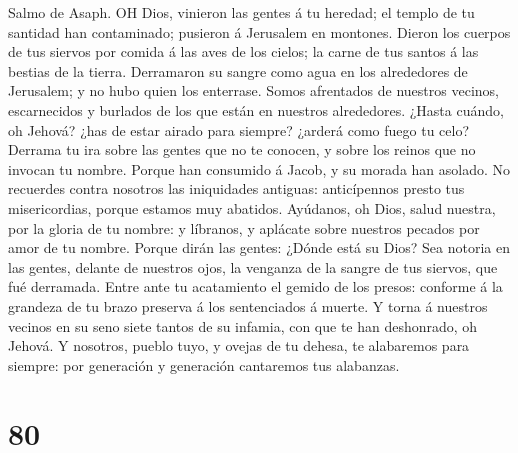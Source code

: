  Salmo de Asaph. OH Dios, vinieron las gentes á tu heredad;
el templo de tu santidad han contaminado; pusieron á Jerusalem en
montones.  Dieron los cuerpos de tus siervos por comida á
las aves de los cielos; la carne de tus santos á las bestias de la
tierra.  Derramaron su sangre como agua en los alrededores
de Jerusalem; y no hubo quien los enterrase.  Somos
afrentados de nuestros vecinos, escarnecidos y burlados de los que están
en nuestros alrededores.  ¿Hasta cuándo, oh Jehová? ¿has de
estar airado para siempre? ¿arderá como fuego tu celo? 
Derrama tu ira sobre las gentes que no te conocen, y sobre los reinos
que no invocan tu nombre.  Porque han consumido á Jacob, y
su morada han asolado.  No recuerdes contra nosotros las
iniquidades antiguas: anticípennos presto tus misericordias, porque
estamos muy abatidos.  Ayúdanos, oh Dios, salud nuestra, por
la gloria de tu nombre: y líbranos, y aplácate sobre nuestros pecados
por amor de tu nombre.  Porque dirán las gentes: ¿Dónde
está su Dios? Sea notoria en las gentes, delante de nuestros ojos, la
venganza de la sangre de tus siervos, que fué derramada. 
Entre ante tu acatamiento el gemido de los presos: conforme á la
grandeza de tu brazo preserva á los sentenciados á muerte. 
Y torna á nuestros vecinos en su seno siete tantos de su infamia, con
que te han deshonrado, oh Jehová.  Y nosotros, pueblo tuyo,
y ovejas de tu dehesa, te alabaremos para siempre: por generación y
generación cantaremos tus alabanzas.

\hypertarget{section-79}{%
\section{80}\label{section-79}}

